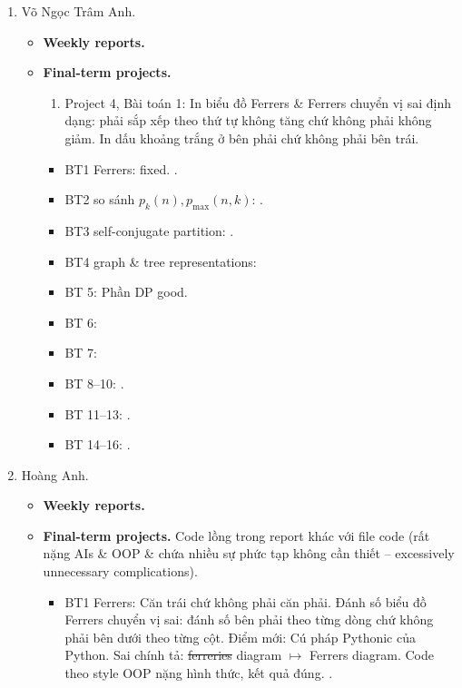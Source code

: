 \documentclass{article}
\begin{document}
\begin{enumerate}
    \item {\sc Võ Ngọc Trâm Anh.}
    \begin{itemize}
        \item {\bf Weekly reports.}
        \item {\bf Final-term projects.}
        \begin{enumerate}
            \item Project 4, Bài toán 1: In biểu đồ Ferrers \& Ferrers chuyển vị sai định dạng: phải sắp xếp theo thứ tự không tăng chứ không phải không giảm. In dấu khoảng trắng ở bên phải chứ không phải bên trái.
        \end{enumerate}
        \begin{itemize}
            \item BT1 Ferrers: fixed. .
            \item BT2 so sánh $p_k(n),p_{\max}(n,k)$: .
            \item BT3 self-conjugate partition: .
            \item BT4 graph \& tree representations:
            \item BT 5: Phần DP good.
            \item BT 6:
            \item BT 7:
            \item BT 8--10: .
            \item BT 11--13: .
            \item BT 14--16: .
        \end{itemize}
    \end{itemize}
    \item {\sc Hoàng Anh.}
    \begin{itemize}
        \item {\bf Weekly reports.}
        \item {\bf Final-term projects.} Code lồng trong report khác với file code (rất nặng AIs \& OOP \& chứa nhiều sự phức tạp không cần thiết -- excessively unnecessary complications).
        \begin{itemize}
            \item BT1 Ferrers: Căn trái chứ không phải căn phải. Đánh số biểu đồ Ferrers chuyển vị sai: đánh số bên phải theo từng dòng chứ không phải bên dưới theo từng cột. Điểm mới: Cú pháp Pythonic của Python. Sai chính tả: \st{ferreries} diagram $\mapsto$ Ferrers diagram. Code theo style OOP nặng hình thức, kết quả đúng. .

\end{itemize}
\end{itemize}
\end{enumerate}
\end{document}
